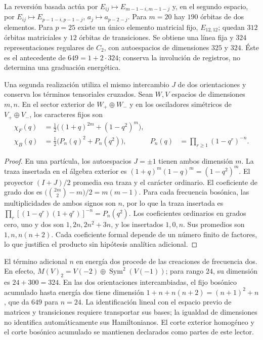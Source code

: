 La reversión basada actúa por
$E_{ij}\mapsto E_{m-1-i,m-1-j}$ y, en el segundo espacio, por
$E_{ij}\mapsto E_{p-1-i,p-1-j}$, $a_j\mapsto a_{p-2-j}$.
Para $m=20$ hay $190$ órbitas de dos elementos. Para $p=25$ existe un
único elemento matricial fijo, $E_{12,12}$; quedan $312$ órbitas
matriciales y $12$ órbitas de transiciones. Se obtiene una línea fija y
$324$ representaciones regulares de $C_2$, con autoespacios de dimensiones
$325$ y $324$. Éste es el antecedente de $649=1+2\cdot324$; conserva la
involución de registros, no determina una graduación energética.

Una segunda realización utiliza el mismo intercambio $J$ de dos
orientaciones y conserva los términos tensoriales cruzados. Sean $W,V$
espacios de dimensiones $m,n$. En el sector exterior de $W_+\oplus W_-$
y en los osciladores simétricos de $V_+\oplus V_-$, los caracteres fijos son
\begin{align}
 \chi_F(q)&=\tfrac12\bigl((1+q)^{2m}+(1-q^2)^m\bigr),\\
 \chi_B(q)&=\tfrac12\bigl(P_n(q)^2+P_n(q^2)\bigr),
 &P_n(q)&=\prod_{r\geq1}(1-q^r)^{-n}.
 \label{eq:ii-ter27-caracteres}
\end{align}
\begin{proof}
En una partícula, los autoespacios $J=\pm1$ tienen ambos dimensión $m$.
La traza insertada en el álgebra exterior es
$(1+q)^m(1-q)^m=(1-q^2)^m$. El proyector $(I+J)/2$ promedia esa traza
y el carácter ordinario. El coeficiente de grado dos es
$\bigl(\binom{2m}{2}-m\bigr)/2=m(m-1)$.
Para cada frecuencia bosónica, las multiplicidades de ambos signos son
$n$, por lo que la traza insertada es
$\prod_r[(1-q^r)(1+q^r)]^{-n}=P_n(q^2)$.
Los coeficientes ordinarios en grados cero, uno y dos son
$1,2n,2n^2+3n$, y los insertados $1,0,n$. Sus promedios son
$1,n,n(n+2)$. Cada coeficiente formal depende de un número finito de
factores, lo que justifica el producto sin hipótesis analítica adicional.
\end{proof}
El término adicional $n$ en energía dos procede de las creaciones de
frecuencia dos. En efecto,
$M(V)_2=V(-2)\oplus\operatorname{Sym}^2(V(-1))$; para rango $24$,
su dimensión es $24+300=324$. En las dos orientaciones intercambiadas,
el fijo bosónico acumulado hasta energía dos tiene dimensión
$1+n+n(n+2)=(n+1)^2+n$, que da $649$ para $n=24$.
La identificación lineal con el espacio previo de matrices y transiciones
requiere transportar sus bases; la igualdad de dimensiones no identifica
automáticamente sus Hamiltonianos. El corte exterior homogéneo y el corte
bosónico acumulado se mantienen declarados como partes de este lector.

